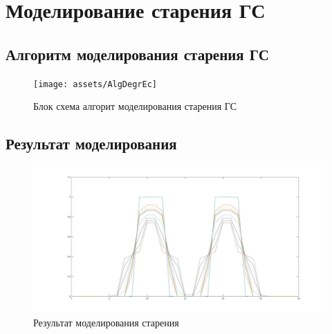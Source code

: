\section{Моделирование старения ГС}
\subsection{Алгоритм моделирования старения ГС}
\begin{figure}[h]
  \centering
  \texttt{[image: assets/AlgDegrEc]}
  \caption{Блок схема алгорит моделирования старения ГС}
  \label{img:AlgDegrEc}
\end{figure}

\subsection{Результат моделирования}
\begin{figure}[h]
  \centering
  \includegraphics[width=1.1\linewidth]{assets/AlX10}
  \caption{Результат моделирования старения}
  \label{img:AlX10}
\end{figure}